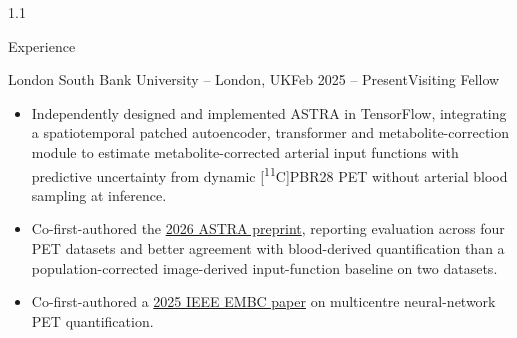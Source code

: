 \documentclass{cv}
\begin{document}
\begin{spacing}{1.1}
\begin{rSection}{Experience}
            \item \begin{rSubsection}{London South Bank University \textnormal{-- London, UK}}{Feb 2025 -- Present}{Visiting Fellow}{}
                \item \begin{itemize}
                    \item Independently designed and implemented ASTRA in TensorFlow, integrating a spatiotemporal patched autoencoder, transformer and metabolite-correction module to estimate metabolite-corrected arterial input functions with predictive uncertainty from dynamic [\textsuperscript{11}C]PBR28 PET without arterial blood sampling at inference.
                    \item Co-first-authored the \href{https://doi.org/10.21203/rs.3.rs-8895728/v1}{2026 ASTRA preprint}, reporting evaluation across four PET datasets and better agreement with blood-derived quantification than a population-corrected image-derived input-function baseline on two datasets.
                    \item Co-first-authored a \href{https://doi.org/10.1109/EMBC58623.2025.11251612}{2025 IEEE EMBC paper} on multicentre neural-network PET quantification.
                \end{itemize}
            \end{rSubsection}
        

\end{rSection}
\end{spacing}
\end{document}
